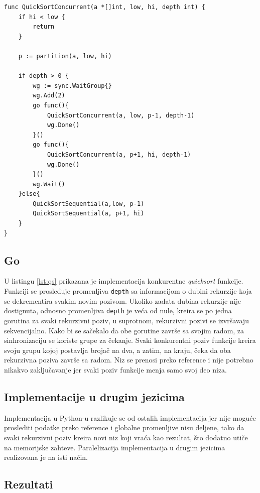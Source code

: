 \documentclass[12pt,oneside]{memoir}
\begin{document}
\begin{center}
\begin{lstlisting}[caption=Implementacija konkurentne funkcije \textit{quicksort} u jeziku Go,label={lst:qs},  backgroundcolor=\color{background}]
func QuickSortConcurrent(a *[]int, low, hi, depth int) {
	if hi < low {
		return
	}

	p := partition(a, low, hi)

	if depth > 0 {
		wg := sync.WaitGroup{}
		wg.Add(2)
		go func(){
			QuickSortConcurrent(a, low, p-1, depth-1)
			wg.Done()
		}()
		go func(){
			QuickSortConcurrent(a, p+1, hi, depth-1)
			wg.Done()
		}()
		wg.Wait()
	}else{
		QuickSortSequential(a,low, p-1)
		QuickSortSequential(a, p+1, hi)
	}	
}
\end{lstlisting}
\end{center}

\subsection{Go}
\label{qs:go}
U listingu \ref{lst:qs} prikazana je implementacija  konkurentne \textit{quicksort} funkcije. Funkciji se prosleđuje promenljiva \texttt{depth} sa informacijom o dubini rekurzije koja se dekrementira svakim novim pozivom. Ukoliko zadata dubina rekurzije nije dostignuta, odnosno promenljiva \texttt{depth} je veća od nule, kreira se po jedna gorutina za svaki rekurzivni poziv, u suprotnom, rekurzivni pozivi se izvršavaju sekvencijalno. Kako bi se sačekalo da obe gorutine završe sa svojim radom, za sinhronizaciju se koriste grupe za čekanje. Svaki konkurentni poziv funkcije kreira svoju grupu kojoj postavlja brojač na dva, a zatim, na kraju, čeka da oba rekurzivna poziva završe sa radom. Niz se prenosi preko reference i nije potrebno nikakvo zaključavanje jer svaki poziv funkcije menja samo svoj deo niza.

\subsection{Implementacije u drugim jezicima}
Implementacija u Python-u razlikuje se od ostalih implementacija jer nije moguće proslediti podatke preko reference i globalne promenljive nisu deljene, tako da svaki rekurzivni poziv kreira novi niz koji vraća kao rezultat, što dodatno utiče na memorijske zahteve. Paralelizacija implementacija u drugim jezicima realizovana je na isti način. 

\subsection{Rezultati}\label{qs:rez}
\end{document}
